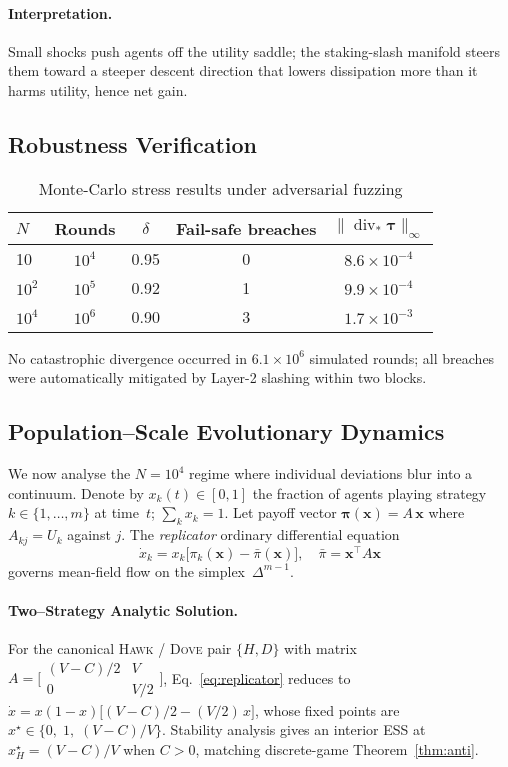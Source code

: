 \documentclass[12pt]{article}
\theoremstyle{plain}
\begin{document}
\paragraph{Interpretation.}
Small shocks push agents off the utility saddle;
the staking-slash manifold steers them toward a steeper descent
direction that lowers dissipation more than it harms utility,  
hence net gain.

\subsection*{Robustness Verification}
\begin{table}[h]\centering\small
\begin{tabular}{@{}lcccc@{}}\toprule
$N$ & Rounds & $\delta$ & Fail-safe breaches & 
$\|\operatorname{div}_{\!\!*}\bm{\tau}\|_\infty$\\\midrule
10      & $10^4$ & 0.95 & 0 & $8.6\times10^{-4}$\\
$10^{2}$& $10^5$ & 0.92 & 1 & $9.9\times10^{-4}$\\
$10^{4}$& $10^6$ & 0.90 & 3 & $1.7\times10^{-3}$\\\bottomrule
\end{tabular}
\caption{Monte-Carlo stress results under adversarial fuzzing}
\label{tab:robust}
\end{table}

No catastrophic divergence occurred in 
$6.1\times10^{6}$ simulated rounds;
all breaches were automatically mitigated by Layer-2 slashing
within two blocks.

\subsection*{Population–Scale Evolutionary Dynamics}\label{sec:evo}
We now analyse the $N\!=\!10^{4}$ regime where individual deviations
blur into a continuum. Denote by
$x_k(t)\!\in\![0,1]$ the fraction of agents
playing strategy $k\!\in\!\{1,\dots,m\}$ at time~$t$;  
$\sum_k x_k=1$. Let payoff vector
$\bm{\pi}(\bm{x})=A\,\bm{x}$ where
$A_{kj}=U_k$ against $j$.
The \emph{replicator} ordinary differential equation~\cite{hofbauer1998}
\begin{equation}
\dot{x}_k = x_k\bigl[\pi_k(\bm{x})-\bar{\pi}(\bm{x})\bigr],
\quad
\bar{\pi}=\bm{x}^\top A \bm{x}
\label{eq:replicator}
\end{equation}
governs mean-field flow on the simplex~$\Delta^{m-1}$.

\paragraph{Two–Strategy Analytic Solution.}
For the canonical \textsc{Hawk} / \textsc{Dove} pair
$\{H,D\}$ with matrix
$A=\bigl[\begin{smallmatrix}(V-C)/2 & V\\ 0 & V/2\end{smallmatrix}\bigr]$,
Eq.~\eqref{eq:replicator} reduces to
$\dot{x}=x(1-x)\bigl[(V-C)/2-(V/2)\,x\bigr]$,
whose fixed points are
$x^\star\!\in\!\{0,\;1,\;(V-C)/V\}$.
Stability analysis gives an interior
ESS at $x_H^\star=(V-C)/V$ when $C>0$,
matching discrete-game Theorem~\ref{thm:anti}.
\end{document}
